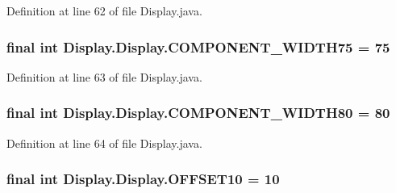 Definition at line 62 of file Display.\+java.

\hypertarget{class_display_1_1_display_a357b313cc7372c3fce2808f738c26369}{}
\subsubsection[{C\+O\+M\+P\+O\+N\+E\+N\+T\+\_\+\+W\+I\+D\+T\+H75}]{\setlength{\rightskip}{0pt plus 5cm}final int Display.\+Display.\+C\+O\+M\+P\+O\+N\+E\+N\+T\+\_\+\+W\+I\+D\+T\+H75 = 75\hspace{0.3cm}{\ttfamily [static]}}\label{class_display_1_1_display_a357b313cc7372c3fce2808f738c26369}


Definition at line 63 of file Display.\+java.

\hypertarget{class_display_1_1_display_a42b05e8c9ef5a9a34a30dd19412e22e0}{}
\subsubsection[{C\+O\+M\+P\+O\+N\+E\+N\+T\+\_\+\+W\+I\+D\+T\+H80}]{\setlength{\rightskip}{0pt plus 5cm}final int Display.\+Display.\+C\+O\+M\+P\+O\+N\+E\+N\+T\+\_\+\+W\+I\+D\+T\+H80 = 80\hspace{0.3cm}{\ttfamily [static]}}\label{class_display_1_1_display_a42b05e8c9ef5a9a34a30dd19412e22e0}


Definition at line 64 of file Display.\+java.

\hypertarget{class_display_1_1_display_a43bf93ef0872de87948d181590683656}{}
\subsubsection[{O\+F\+F\+S\+E\+T10}]{\setlength{\rightskip}{0pt plus 5cm}final int Display.\+Display.\+O\+F\+F\+S\+E\+T10 = 10\hspace{0.3cm}{\ttfamily [static]}}\label{class_display_1_1_display_a43bf93ef0872de87948d181590683656}


